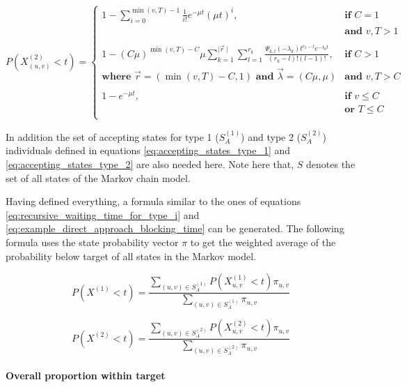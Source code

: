 \begin{equation}
    P(X_{(u,v)}^{(2)} < t) =
    \begin{cases}
        1 - \sum_{i=0}^{\min(v,T)-1} \frac{1}{i!} e^{-\mu t} (\mu t)^i,
            & \textbf{if } C = 1 \\
        & \textbf{and } v, T > 1 \\
        & \\
        1 - (C \mu ) ^ {\min(v,T) - C} \mu
            \sum_{k=1}^{\mid \vec{r} \mid} \sum_{l=1}^{r_k}
            \frac{\Psi_{k,l}(-\lambda_k)t^{r_k - l}
            e^{-\lambda_k t}}{(r_k - l)! (l - 1)!},
            & \textbf{if } C > 1 \\
        \textbf{where } \vec{r}=(\min(v, T) - C, 1) \textbf{ and }
            \vec{\lambda}=(C \mu, \mu) & \textbf{and } v, T  > C \\
        & \\
        1 - e^{-\mu t}, & \textbf{if } v \leq C \\
        & \textbf{or } T \leq C \\
    \end{cases}
\end{equation}
\normalsize

In addition the set of accepting states for type 1 (\(S_A^{(1)}\)) and type 2
(\(S_A^{(2)}\)) individuals defined in equations
\ref{eq:accepting_states_type_1} and \ref{eq:accepting_states_type_2} are also
needed here.
Note here that, \(S\) denotes the set of all states of the Markov chain model.


Having defined everything, a formula similar to the ones
of equations \ref{eq:recursive_waiting_time_for_type_i} and
\ref{eq:example_direct_approach_blocking_time} can be generated.
The following formula uses the state probability vector \(\pi\) to get the
weighted average of the probability below target of all states in the Markov
model.

\begin{equation}
    P(X^{(1)} < t) = \frac{\sum_{(u,v) \in S_A^{(1)}} P(X_{u,v}^{(1)} < t)
    \pi_{u,v} }{\sum_{(u,v) \in S_A^{(1)}} \pi_{u,v}}
\end{equation}

\begin{equation}
    P(X^{(2)} < t) = \frac{\sum_{(u,v) \in S_A^{(2)}} P(X_{u,v}^{(2)} < t)
    \pi_{u,v} }{\sum_{(u,v) \in S_A^{(2)}} \pi_{u,v}}
\end{equation}


\paragraph{Overall proportion within target}

